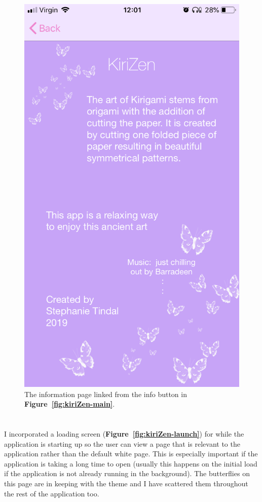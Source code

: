 \documentclass[11pt]{article}
\begin{document}
\begin{figure}[!ht]
\begin{minipage}{0.45\textwidth}
                            \includegraphics[width=0.7\linewidth]{KiriZen/info}
                            \caption{The information page linked from the info button in \textbf{Figure~\ref{fig:kiriZen-main}}.\\\\}
                            \label{fig:kiriZen-info}
                        \end{minipage}
                    \end{figure}
                    
                    \paragraph{}
                    I incorporated a loading screen (\textbf{Figure~\ref{fig:kiriZen-launch}}) for while the application is starting up so the user can view a page that is relevant to the application rather than the default white page. This is especially important if the application is taking a long time to open (usually this happens on the initial load if the application is not already running in the background). The butterflies on this page are in keeping with the theme and I have scattered them throughout the rest of the application too.
                    
\end{document}
